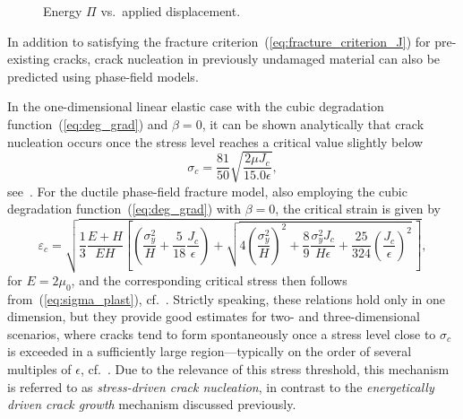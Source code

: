 \documentclass[pdflatex,sn-mathphys-num]{sn-jnl}%
\theoremstyle{thmstyleone}%
\theoremstyle{thmstyletwo}%
\theoremstyle{thmstylethree}%
\begin{document}
\begin{figure}[htb]
    \centering
    \begin{minipage}[t]{0.49\textwidth}
        \centering
        \resizebox{\linewidth}{!}{%
        }
        \caption{Stress $\sigma$ vs.\ strain $\varepsilon$. The dots indicate the fracture stress $\sigma^*$, whereas the vertical dashed lines display the fracture strain $\varepsilon^*$.}
        \label{fig:reaction_forces}
    \end{minipage}%
    \hfill
    \begin{minipage}[t]{0.49\textwidth}
        \centering
        \resizebox{\linewidth}{!}{%
        }
        \caption{Energy $\Pi$ vs.\ applied displacement.}
        \label{fig:energy_vs_displacement}
    \end{minipage}
\end{figure}

In addition to satisfying the fracture criterion~(\ref{eq:fracture_criterion_J}) for pre-existing cracks, crack nucleation in previously undamaged material can also be predicted using phase-field models.

In the one-dimensional linear elastic case with the cubic degradation function~(\ref{eq:deg_grad}) and $\beta = 0$, it can be shown analytically that crack nucleation occurs once the stress level reaches a critical value slightly below
\begin{equation}
    \sigma_c = \dfrac{81}{50}\sqrt{\dfrac{2\mu J_c}{15.0\epsilon}},
    \label{eq:sig_c}
\end{equation}
see~\cite{schlueter_phase_2018}. For the ductile phase-field fracture model, also employing the cubic degradation function~(\ref{eq:deg_grad}) with $\beta = 0$, the critical strain is given by
\begin{equation}
    \varepsilon_c = \sqrt{\dfrac{1}{3} \dfrac{E+H}{EH}
    \left[\left(\dfrac{\sigma_y^2}{H} + \dfrac{5}{18}\dfrac{J_c}{\epsilon}\right)
    + \sqrt{4\left(\dfrac{\sigma_y^2}{H}\right)^2
    + \dfrac{8}{9} \dfrac{\sigma_y^2 J_c}{H\epsilon}
    + \dfrac{25}{324} \left(\dfrac{J_c}{\epsilon}\right)^2}\,\right]},
    \label{eq:ductile_fracture_strain}
\end{equation}
for $E = 2\mu_0$, and the corresponding critical stress then follows from~(\ref{eq:sigma_plast}), cf.~\cite{noll_3d_2020}. Strictly speaking, these relations hold only in one dimension, but they provide good estimates for two- and three-dimensional scenarios, where cracks tend to form spontaneously once a stress level close to $\sigma_c$ is exceeded in a sufficiently large region—typically on the order of several multiples of $\epsilon$, cf.~\cite{kuhn_numerical_2013}. Due to the relevance of this stress threshold, this mechanism is referred to as \textsl{stress-driven crack nucleation}, in contrast to the \textsl{energetically driven crack growth} mechanism discussed previously.
\end{document}
